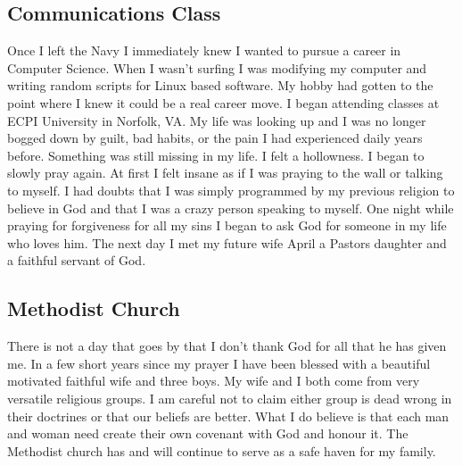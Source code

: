 \documentclass[11pt,a4paper]{scrartcl} %
\begin{document}
\subsection{Communications Class}
\begin{doublespace}
Once I left the Navy I immediately knew I wanted to pursue a career in Computer Science. When I wasn't surfing I was modifying my computer and writing random scripts for Linux based software. My hobby had gotten to the point where I knew it could be a real career move. I began attending classes at ECPI University in Norfolk, VA. My life was looking up and I was no longer bogged down by guilt, bad habits, or the pain I had experienced daily years before. Something was still missing in my life. I felt a hollowness. I began to slowly pray again. At first I felt insane as if I was praying to the wall or talking to myself. I had doubts that I was simply programmed by my previous religion to believe in God and that I was a crazy person speaking to myself. One night while praying for forgiveness for all my sins I began to ask God for someone in my life who loves him. The next day I met my future wife April a Pastors daughter and a faithful servant of God. 
\subsection{Methodist Church}
There is not a day that goes by that I don't thank God for all that he has given me. In a few short years since my prayer I have been blessed with a beautiful motivated faithful wife and three boys. My wife and I both come from very versatile religious groups. I am careful not to claim either group is dead wrong in their doctrines or that our beliefs are better. What I do believe is that each man and woman need create their own covenant with God and honour it. The Methodist church has and will continue to serve as a safe haven for my family.

\end{doublespace}
\end{document}
